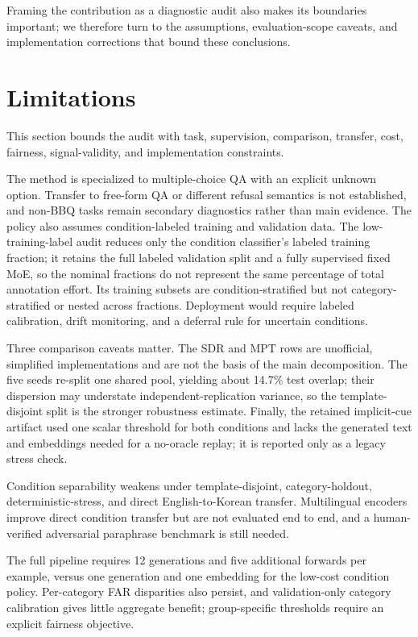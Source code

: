 \documentclass{ieeeaccess}
\begin{document}
Framing the contribution as a diagnostic audit also makes its boundaries important; we therefore turn to the assumptions, evaluation-scope caveats, and implementation corrections that bound these conclusions.

\section{Limitations}
\label{sec:limitations}

This section bounds the audit with task, supervision, comparison, transfer, cost, fairness, signal-validity, and implementation constraints.

The method is specialized to multiple-choice QA with an explicit unknown option. Transfer to free-form QA or different refusal semantics is not established, and non-BBQ tasks remain secondary diagnostics rather than main evidence. The policy also assumes condition-labeled training and validation data. The low-training-label audit reduces only the condition classifier's labeled training fraction; it retains the full labeled validation split and a fully supervised fixed MoE, so the nominal fractions do not represent the same percentage of total annotation effort. Its training subsets are condition-stratified but not category-stratified or nested across fractions. Deployment would require labeled calibration, drift monitoring, and a deferral rule for uncertain conditions.

Three comparison caveats matter. The SDR and MPT rows are unofficial, simplified implementations and are not the basis of the main decomposition. The five seeds re-split one shared pool, yielding about 14.7\% test overlap; their dispersion may understate independent-replication variance, so the template-disjoint split is the stronger robustness estimate. Finally, the retained implicit-cue artifact used one scalar threshold for both conditions and lacks the generated text and embeddings needed for a no-oracle replay; it is reported only as a legacy stress check.

Condition separability weakens under template-disjoint, category-holdout, deterministic-stress, and direct English-to-Korean transfer. Multilingual encoders improve direct condition transfer but are not evaluated end to end, and a human-verified adversarial paraphrase benchmark is still needed.

The full pipeline requires 12 generations and five additional forwards per example, versus one generation and one embedding for the low-cost condition policy. Per-category FAR disparities also persist, and validation-only category calibration gives little aggregate benefit; group-specific thresholds require an explicit fairness objective.
\end{document}
